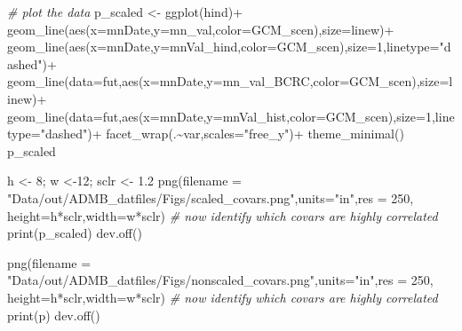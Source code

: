 \documentclass[
]{article}
\newenvironment{Shaded}{\begin{snugshade}}{\end{snugshade}}
\newcommand{\AttributeTok}[1]{\textcolor[rgb]{0.77,0.63,0.00}{#1}}
\newcommand{\CommentTok}[1]{\textcolor[rgb]{0.56,0.35,0.01}{\textit{#1}}}
\newcommand{\DecValTok}[1]{\textcolor[rgb]{0.00,0.00,0.81}{#1}}
\newcommand{\FloatTok}[1]{\textcolor[rgb]{0.00,0.00,0.81}{#1}}
\newcommand{\FunctionTok}[1]{\textcolor[rgb]{0.00,0.00,0.00}{#1}}
\newcommand{\NormalTok}[1]{#1}
\newcommand{\OtherTok}[1]{\textcolor[rgb]{0.56,0.35,0.01}{#1}}
\newcommand{\SpecialCharTok}[1]{\textcolor[rgb]{0.00,0.00,0.00}{#1}}
\newcommand{\StringTok}[1]{\textcolor[rgb]{0.31,0.60,0.02}{#1}}
\begin{document}
\begin{Shaded}
\begin{Highlighting}[]
      \CommentTok{\# plot the data}
\NormalTok{       p\_scaled }\OtherTok{\textless{}{-}} \FunctionTok{ggplot}\NormalTok{(hind)}\SpecialCharTok{+}
         \FunctionTok{geom\_line}\NormalTok{(}\FunctionTok{aes}\NormalTok{(}\AttributeTok{x=}\NormalTok{mnDate,}\AttributeTok{y=}\NormalTok{mn\_val,}\AttributeTok{color=}\NormalTok{GCM\_scen),}\AttributeTok{size=}\NormalTok{linew)}\SpecialCharTok{+}
          \FunctionTok{geom\_line}\NormalTok{(}\FunctionTok{aes}\NormalTok{(}\AttributeTok{x=}\NormalTok{mnDate,}\AttributeTok{y=}\NormalTok{mnVal\_hind,}\AttributeTok{color=}\NormalTok{GCM\_scen),}\AttributeTok{size=}\DecValTok{1}\NormalTok{,}\AttributeTok{linetype=}\StringTok{"dashed"}\NormalTok{)}\SpecialCharTok{+}
         \FunctionTok{geom\_line}\NormalTok{(}\AttributeTok{data=}\NormalTok{fut,}\FunctionTok{aes}\NormalTok{(}\AttributeTok{x=}\NormalTok{mnDate,}\AttributeTok{y=}\NormalTok{mn\_val\_BCRC,}\AttributeTok{color=}\NormalTok{GCM\_scen),}\AttributeTok{size=}\NormalTok{linew)}\SpecialCharTok{+}
          \FunctionTok{geom\_line}\NormalTok{(}\AttributeTok{data=}\NormalTok{fut,}\FunctionTok{aes}\NormalTok{(}\AttributeTok{x=}\NormalTok{mnDate,}\AttributeTok{y=}\NormalTok{mnVal\_hist,}\AttributeTok{color=}\NormalTok{GCM\_scen),}\AttributeTok{size=}\DecValTok{1}\NormalTok{,}\AttributeTok{linetype=}\StringTok{"dashed"}\NormalTok{)}\SpecialCharTok{+}
         \FunctionTok{facet\_wrap}\NormalTok{(.}\SpecialCharTok{\textasciitilde{}}\NormalTok{var,}\AttributeTok{scales=}\StringTok{"free\_y"}\NormalTok{)}\SpecialCharTok{+}
         \FunctionTok{theme\_minimal}\NormalTok{()}
\NormalTok{      p\_scaled}
      
\NormalTok{      h }\OtherTok{\textless{}{-}} \DecValTok{8}\NormalTok{; w }\OtherTok{\textless{}{-}}\DecValTok{12}\NormalTok{; sclr }\OtherTok{\textless{}{-}} \FloatTok{1.2}
      \FunctionTok{png}\NormalTok{(}\AttributeTok{filename =} \StringTok{"Data/out/ADMB\_datfiles/Figs/scaled\_covars.png"}\NormalTok{,}\AttributeTok{units=}\StringTok{"in"}\NormalTok{,}\AttributeTok{res =} \DecValTok{250}\NormalTok{, }\AttributeTok{height=}\NormalTok{h}\SpecialCharTok{*}\NormalTok{sclr,}\AttributeTok{width=}\NormalTok{w}\SpecialCharTok{*}\NormalTok{sclr)}
      \CommentTok{\# now identify which covars are highly correlated}
      \FunctionTok{print}\NormalTok{(p\_scaled)}
      \FunctionTok{dev.off}\NormalTok{()}
     
      \FunctionTok{png}\NormalTok{(}\AttributeTok{filename =} \StringTok{"Data/out/ADMB\_datfiles/Figs/nonscaled\_covars.png"}\NormalTok{,}\AttributeTok{units=}\StringTok{"in"}\NormalTok{,}\AttributeTok{res =} \DecValTok{250}\NormalTok{, }\AttributeTok{height=}\NormalTok{h}\SpecialCharTok{*}\NormalTok{sclr,}\AttributeTok{width=}\NormalTok{w}\SpecialCharTok{*}\NormalTok{sclr)}
      \CommentTok{\# now identify which covars are highly correlated}
      \FunctionTok{print}\NormalTok{(p)}
      \FunctionTok{dev.off}\NormalTok{()}
      

\end{Highlighting}
\end{Shaded}
\end{document}
